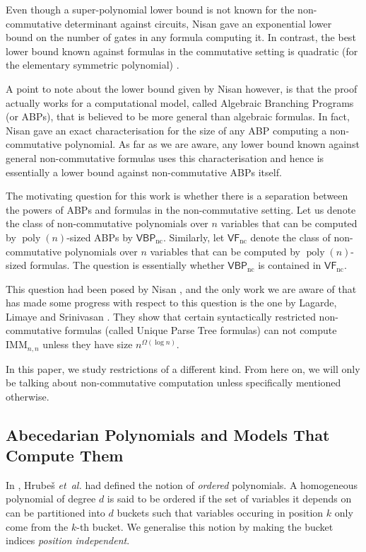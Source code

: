\documentclass[10pt,a4paper]{article}
\def\etal{\emph{et~al.}}
\def\Hrubes{Hrube{\v{s}}}
\def\poly{\operatorname{poly}}
\def\ncVF{\mathsf{VF}_{\text{nc}}}
\def\ncVBP{\mathsf{VBP}_{\text{nc}}}
\newcommand{\imm}[2]{\mathrm{IMM}_{#1,#2}}
\begin{document}
Even though a super-polynomial lower bound is not known for the non-commutative determinant against circuits, Nisan \cite{N91} gave an exponential lower bound on the number of gates in any formula computing it. 
In contrast, the best lower bound known against formulas in the commutative setting is quadratic (for the elementary symmetric polynomial) \cite{N66,K85,CKSV19}. 

A point to note about the lower bound given by Nisan however, is that the proof actually works for a computational model, called Algebraic Branching Programs (or ABPs), that is believed to be more general than algebraic formulas. 
In fact, Nisan \cite{N91} gave an exact characterisation for the size of any ABP computing a non-commutative polynomial. 
As far as we are aware, any lower bound known against general non-commutative formulas uses this characterisation and hence is essentially a lower bound against non-commutative ABPs itself.

The motivating question for this work is whether there is a separation between the powers of ABPs and formulas in the non-commutative setting. 
Let us denote the class of non-commutative polynomials over $n$ variables that can be computed by $\poly(n)$-sized ABPs by $\ncVBP$. 
Similarly, let $\ncVF$ denote the class of non-commutative polynomials over $n$ variables that can be computed by $\poly(n)$-sized formulas.
The question is essentially whether $\ncVBP$ is contained in $\ncVF$.

This question had been posed by Nisan \cite{N91}, and the only work we are aware of that has made some progress with respect to this question is the one by Lagarde, Limaye and Srinivasan \cite{LLS19}.
They show that certain syntactically restricted non-commutative formulas (called Unique Parse Tree formulas) can not compute $\imm{n}{n}$ unless they have size $n^{\Omega(\log n)}$.

In this paper, we study restrictions of a different kind.
From here on, we will only be talking about non-commutative computation unless specifically mentioned otherwise.

\subsection{Abecedarian Polynomials and Models That Compute Them}

In \cite{HWY11}, {\Hrubes} {\etal} had defined the notion of \emph{ordered} polynomials. 
A homogeneous polynomial of degree $d$ is said to be ordered if the set of variables it depends on can be partitioned into $d$ buckets such that variables occuring in position $k$ only come from the $k$-th bucket.
We generalise this notion by making the bucket indices \emph{position independent}.
\end{document}
